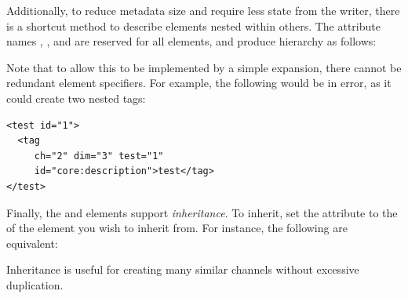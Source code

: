 \documentclass{article}
\begin{document}
\label{path-spec}
Additionally, to reduce metadata size and require less state from the
writer, there is a shortcut method to describe elements nested within
others.  The attribute names , , and  are
reserved for all elements, and produce hierarchy as follows:


Note that to allow this to be implemented by a simple expansion, there
cannot be redundant element specifiers.  For example, the following
would be in error, as it could create two nested  tags:

\begin{lstlisting}[language=siexml]
<test id="1">
  <tag 
     ch="2" dim="3" test="1"
     id="core:description">test</tag>
</test>
\end{lstlisting}

\label{inherit}
Finally, the  and  elements support
\emph{inheritance}.  To inherit, set the  attribute to the
 of the element you wish to inherit from.  For instance, the
following are equivalent:


Inheritance is useful for creating many similar channels without
excessive duplication.  
\end{document}
